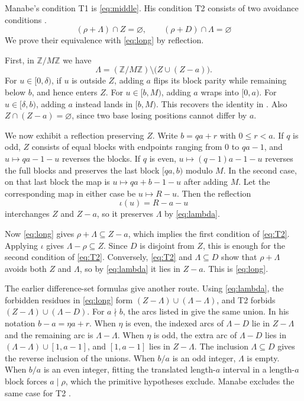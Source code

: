\documentclass[11pt]{article}
\newcommand{\Z}{\mathbb{Z}}
\begin{document}
Manabe's condition T1 is \eqref{eq:middle}. His condition T2 consists
of two avoidance conditions \cite[Definition~19 and Lemma~22]{manabe}.
\begin{equation}\label{eq:T2}
 (\rho+\Lambda)\cap Z=\varnothing,\qquad
 (\rho+D)\cap\Lambda=\varnothing
\end{equation}
We prove their equivalence with \eqref{eq:long} by reflection.

First, in $\Z/M\Z$ we have
\begin{equation}\label{eq:lambda}
 \Lambda=(\Z/M\Z)\setminus\bigl(Z\cup(Z-a)\bigr).
\end{equation}
For $u\in[0,\delta)$, if $u$ is outside $Z$, adding $a$ flips its
block parity while remaining below $b$, and hence enters $Z$.
For $u\in[b,M)$, adding $a$ wraps into $[0,a)$.
For $u\in[\delta,b)$, adding $a$ instead lands in $[b,M)$.
This recovers the identity in \cite[Lemma~22]{manabe}. Also
$Z\cap(Z-a)=\varnothing$, since two base losing positions cannot differ by $a$.

We now exhibit a reflection preserving $Z$. Write $b=qa+r$ with
$0\le r<a$. If $q$ is odd, $Z$ consists of equal blocks with
endpoints ranging from $0$ to $qa-1$, and $u\mapsto qa-1-u$
reverses the blocks. If $q$ is even, $u\mapsto (q-1)a-1-u$
reverses the full blocks and preserves the last block $[qa,b)$
modulo $M$. In the second case, on that last block the map is
$u\mapsto qa+b-1-u$ after adding $M$. Let the corresponding map in
either case be $u\mapsto R-u$.
Then the reflection
\[
 \iota(u)=R-a-u
\]
interchanges $Z$ and $Z-a$, so it preserves $\Lambda$ by
\eqref{eq:lambda}.

Now \eqref{eq:long} gives $\rho+\Lambda\subseteq Z-a$, which
implies the first condition of \eqref{eq:T2}. Applying $\iota$
gives $\Lambda-\rho\subseteq Z$. Since $D$ is disjoint from
$Z$, this is enough for the second condition of \eqref{eq:T2}.
Conversely, \eqref{eq:T2} and $\Lambda\subseteq D$ show that
$\rho+\Lambda$ avoids both $Z$ and $\Lambda$, so by
\eqref{eq:lambda} it lies in $Z-a$. This is \eqref{eq:long}.

The earlier difference-set formulas give another route. Using
\eqref{eq:lambda}, the forbidden residues in \eqref{eq:long} form
$(Z-\Lambda)\cup(\Lambda-\Lambda)$, and T2 forbids
$(Z-\Lambda)\cup(\Lambda-D)$. For $a\nmid b$, the arcs listed in
\cite[Proposition~29 and Appendix~A]{manabe} give the same union.
In his notation $b-a=\eta a+r$. When $\eta$ is even, the indexed arcs
of $\Lambda-D$ lie in $Z-\Lambda$ and the remaining arc is
$\Lambda-\Lambda$. When $\eta$ is odd, the extra arc of $\Lambda-D$
lies in $(\Lambda-\Lambda)\cup[1,a-1]$, and $[1,a-1]$ lies in
$Z-\Lambda$. The inclusion $\Lambda\subseteq D$ gives the reverse
inclusion of the unions.
When $b/a$ is an odd integer, $\Lambda$ is empty. When $b/a$ is an
even integer, fitting the translated length-$a$ interval in a
length-$a$ block forces $a\mid\rho$, which the primitive hypotheses
exclude. Manabe excludes the same case for T2
\cite[Theorem~30 and Proposition~61]{manabe}.
\end{document}
